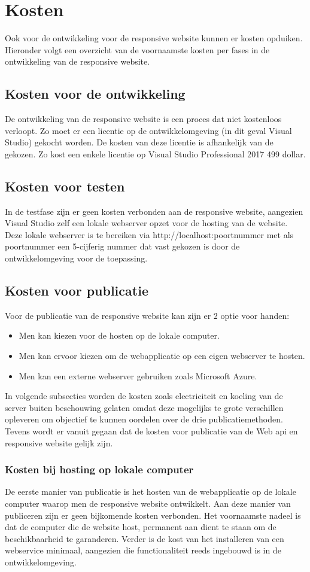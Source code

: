 \section{Kosten}
Ook voor de ontwikkeling voor de responsive website kunnen er kosten opduiken. Hieronder volgt een overzicht van de voornaamste
kosten per fases in de ontwikkeling van de responsive website.
\subsection{Kosten voor de ontwikkeling}
De ontwikkeling van de responsive website is een proces dat niet kostenloos verloopt. Zo moet er een licentie op de ontwikkelomgeving (in dit geval Visual Studio) gekocht worden.
De kosten van deze licentie is afhankelijk van de gekozen. Zo kost een enkele licentie op Visual Studio Professional 2017 499 dollar.

\subsection{Kosten voor testen}
In de testfase zijn er geen kosten verbonden aan de responsive website, aangezien Visual Studio zelf een lokale webserver opzet
voor de hosting van de website. Deze lokale webserver is te bereiken via http://localhost:poortnummer met als poortnummer een
5-cijferig nummer dat vast gekozen is door de ontwikkelomgeving voor de toepassing.
\subsection{Kosten voor publicatie}
Voor de publicatie van de responsive website kan zijn er 2 optie voor handen:
\begin{itemize}
  \item Men kan kiezen voor de hosten op de lokale computer.
  \item Men kan ervoor kiezen om de webapplicatie op een eigen webserver te hosten.
  \item Men kan een externe webserver gebruiken zoals Microsoft Azure.
\end{itemize}
In volgende subsecties worden de kosten zoals electriciteit en koeling van de server buiten beschouwing gelaten omdat deze
mogelijks te grote verschillen opleveren om objectief te kunnen oordelen over de drie publicatiemethoden. Tevens wordt er vanuit
gegaan dat de kosten voor publicatie van de Web api en responsive website gelijk zijn.

\subsubsection{Kosten bij hosting op lokale computer}
De eerste manier van publicatie is het hosten van de webapplicatie op de lokale computer waarop men de responsive website
ontwikkelt. Aan deze manier van publiceren zijn er geen bijkomende kosten verbonden. Het voornaamste nadeel is dat de computer
die de website host, permanent aan dient te staan om de beschikbaarheid te garanderen. Verder is de kost van het installeren
van een webservice minimaal, aangezien die functionaliteit reeds ingebouwd is in de ontwikkelomgeving.

